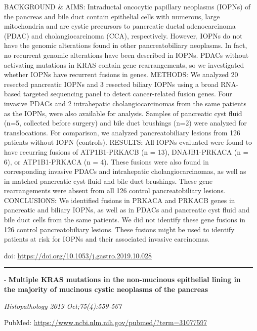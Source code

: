 \documentclass[
]{article}
\renewcommand{\linethickness}{0.05em}
\begin{document}
BACKGROUND \& AIMS: Intraductal oncocytic papillary neoplasms (IOPNs) of
the pancreas and bile duct contain epithelial cells with numerous, large
mitochondria and are cystic precursors to pancreatic ductal
adenocarcinoma (PDAC) and cholangiocarcinoma (CCA), respectively.
However, IOPNs do not have the genomic alterations found in other
pancreatobiliary neoplasms. In fact, no recurrent genomic alterations
have been described in IOPNs. PDACs without activating mutations in KRAS
contain gene rearrangements, so we investigated whether IOPNs have
recurrent fusions in genes. METHODS: We analyzed 20 resected pancreatic
IOPNs and 3 resected biliary IOPNs using a broad RNA-based targeted
sequencing panel to detect cancer-related fusion genes. Four invasive
PDACs and 2 intrahepatic cholangiocarcinomas from the same patients as
the IOPNs, were also available for analysis. Samples of pancreatic cyst
fluid (n=5, collected before surgery) and bile duct brushings (n=2) were
analyzed for translocations. For comparison, we analyzed
pancreatobiliary lesions from 126 patients without IOPN (controls).
RESULTS: All IOPNs evaluated were found to have recurring fusions of
ATP1B1-PRKACB (n = 13), DNAJB1-PRKACA (n = 6), or ATP1B1-PRKACA (n = 4).
These fusions were also found in corresponding invasive PDACs and
intrahepatic cholangiocarcinomas, as well as in matched pancreatic cyst
fluid and bile duct brushings. These gene rearrangements were absent
from all 126 control pancreatobiliary lesions. CONCLUSIONS: We
identified fusions in PRKACA and PRKACB genes in pancreatic and biliary
IOPNs, as well as in PDACs and pancreatic cyst fluid and bile duct cells
from the same patients. We did not identify these gene fusions in 126
control pancreatobiliary lesions. These fusions might be used to
identify patients at risk for IOPNs and their associated invasive
carcinomas.

doi: \url{https://doi.org/10.1053/j.gastro.2019.10.028}

\begin{center}\rule{0.5\linewidth}{\linethickness}\end{center}

- \textbf{Multiple KRAS mutations in the non-mucinous epithelial lining
in the majority of mucinous cystic neoplasms of the pancreas}

\emph{Histopathology 2019 Oct;75(4):559-567}

PubMed: \url{https://www.ncbi.nlm.nih.gov/pubmed/?term=31077597}
\end{document}
